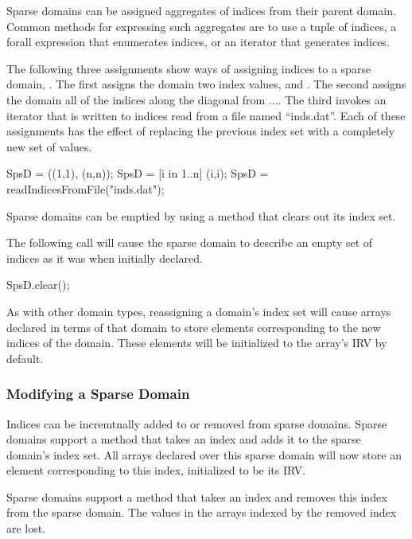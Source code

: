 Sparse domains can be assigned aggregates of indices from their parent
domain.  Common methods for expressing such aggregates are to use a
tuple of indices, a forall expression that enumerates indices, or an
iterator that generates indices.

\begin{example}
The following three assignments show ways of assigning indices to a
sparse domain, .  The first assigns the domain two index
values,  and .  The second assigns the domain
all of the indices along the diagonal from
$\ldots$.  The third invokes an iterator that
is written to  indices read from a file named
``inds.dat''.  Each of these assignments has the effect of replacing
the previous index set with a completely new set of values.
\begin{chapel}
SpsD = ((1,1), (n,n));
SpsD = [i in 1..n] (i,i);
SpsD = readIndicesFromFile("inds.dat");
\end{chapel}
\end{example}

Sparse domains can be emptied by using a method  that
clears out its index set.

\begin{example}
The following call will cause the sparse domain  to
describe an empty set of indices as it was when initially declared.
\begin{chapel}
SpsD.clear();
\end{chapel}
\end{example}

As with other domain types, reassigning a domain's index set will
cause arrays declared in terms of that domain to store elements
corresponding to the new indices of the domain.  These elements will
be initialized to the array's IRV by default.



\subsubsection{Modifying a Sparse Domain}

Indices can be incremtnally added to or removed from sparse domains.
Sparse domains support a method  that takes an index and
adds it to the sparse domain's index set.  All arrays declared over
this sparse domain will now store an element corresponding to this
index, initialized to be its IRV.

Sparse domains support a method  that takes an index and
removes this index from the sparse domain.  The values in the arrays
indexed by the removed index are lost.

